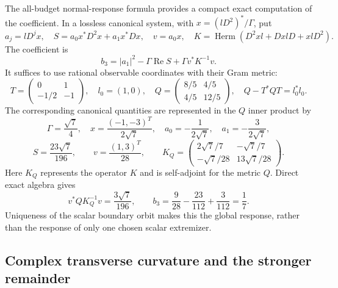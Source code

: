 The all-budget normal-response formula provides a compact exact computation
of the coefficient.  In a lossless canonical system, with
$x=(lD^2)^*/\Gamma$, put
\[
 a_j=lD^jx,\quad
 S=a_0x^*D^2x+a_1x^*Dx,\quad v=a_0x,
\quad
 K=\operatorname{Herm}\!\left(
 D^2xl+DxlD+xlD^2\right).
\]
The coefficient is
\begin{equation}
 b_3=|a_1|^2-\Gamma\operatorname{Re}S+
                  \Gamma v^*K^{-1}v.
 \label{I:R:eq:three-response}
\end{equation}
It suffices to use rational observable coordinates with their Gram metric:
\[
 T=\begin{pmatrix}0&1\\-1/2&-1\end{pmatrix},\quad
 l_0=(1,0),\quad
 Q=\begin{pmatrix}8/5&4/5\\4/5&12/5\end{pmatrix},\quad
 Q-T^*QT=l_0^*l_0.
\]
The corresponding canonical quantities are represented in the $Q$ inner
product by
\[
 \Gamma=\frac{\sqrt7}{4},\quad
 x=\frac{(-1,-3)^T}{2\sqrt7},\quad
 a_0=-\frac1{2\sqrt7},\quad a_1=-\frac3{2\sqrt7},
\]
\[
 S=\frac{23\sqrt7}{196},\qquad
 v=\frac{(1,3)^T}{28},\qquad
 K_Q=\begin{pmatrix}
 2\sqrt7/7&-\sqrt7/7\\
 -\sqrt7/28&13\sqrt7/28
 \end{pmatrix}.
\]
Here $K_Q$ represents the operator $K$ and is self-adjoint for the metric
$Q$. Direct exact algebra gives
\[
 v^*QK_Q^{-1}v=\frac{3\sqrt7}{196},\qquad
 b_3=\frac9{28}-\frac{23}{112}+\frac3{112}=\frac17.
\]
Uniqueness of the scalar boundary orbit makes this the global response,
rather than the response of only one chosen scalar extremizer.

\subsection{Complex transverse curvature and the stronger remainder}

